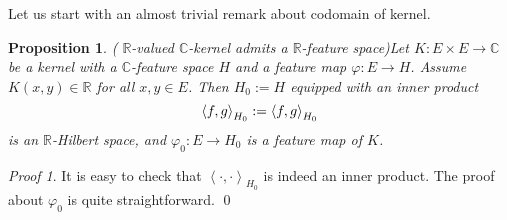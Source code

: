 \documentclass[a4paper,12pt]{article}
\newtheorem{prp}[thm]{Proposition}
\theoremstyle{remark}
\newtheorem*{prf}{Proof}
\theoremstyle{definition}
\theoremstyle{definition}
\theoremstyle{definition}
\newcommand{\ip}[2]{\left<#1, #2 \right>}
\let\Re\relax
\DeclareMathOperator{\Re}{Re}
\begin{document}
Let us start with an almost trivial remark about codomain of kernel.
\begin{prp} ( \( \mathbb{R} \)-valued \( \mathbb{C} \)-kernel admits a \( \mathbb{R} \)-feature space)\label{R-valued C-kernel admits a R-feature space}
	Let \( K:E \times E \to \mathbb{C} \) be a kernel with a \( \mathbb{C} \)-feature space \( H \) and a feature map \( \varphi:E \to H \). Assume \( K(x,y)\in \mathbb{R} \) for all \( x,y \in E \). Then \( H_0 := H \) equipped with an inner product
	\begin{equation*}
		\ip{f}{g}_{H_0} := \Re \ip{f}{g}_{H_0}
	\end{equation*}
	is an \( \mathbb{R} \)-Hilbert space, and \( \varphi_0:E \to H_0 \) is a feature map of \( K \).
\end{prp}
\begin{prf}
	It is easy to check that \( \ip{\cdot }{\cdot }_{H_0} \) is indeed an inner product. The proof about \( \varphi_0 \) is quite straightforward.
	\qed\end{prf}
\end{document}
